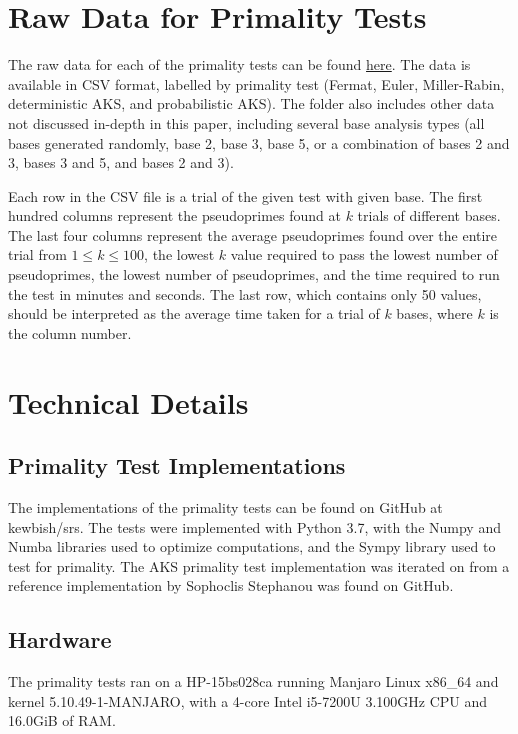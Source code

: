 \documentclass{article}
\begin{document}
\appendix
\begin{appendices}
\section{Raw Data for Primality Tests} \label{appendix:data}

The raw data for each of the primality tests can be found \href{https://github.com/kewbish/srs/tree/master/scripts/dataset}{here}. %
The data is available in CSV format, labelled by primality test (Fermat, Euler, Miller-Rabin, deterministic AKS, and probabilistic AKS). The folder also includes other data not discussed in-depth in this paper, including several base analysis types (all bases generated randomly, base 2, base 3, base 5, or a combination of bases 2 and 3, bases 3 and 5, and bases 2 and 3).

Each row in the CSV file is a trial of the given test with given base. The first hundred columns represent the pseudoprimes found at $k$ trials of different bases. The last four columns represent the average pseudoprimes found over the entire trial from $1 \leq k \leq 100$, the lowest $k$ value required to pass the lowest number of pseudoprimes, the lowest number of pseudoprimes, and the time required to run the test in minutes and seconds. 
The last row, which contains only 50 values, should be interpreted as the average time taken for a trial of $k$ bases, where $k$ is the column number.

\section{Technical Details} \label{appendix:tech}

\subsection{Primality Test Implementations}
The implementations of the primality tests can be found on GitHub at kewbish/srs. %
The tests were implemented with Python 3.7, with the Numpy and Numba libraries used to optimize computations, and the Sympy library used to test for primality.
The AKS primality test implementation was iterated on from a reference implementation by Sophoclis Stephanou was found on GitHub. %

\subsection{Hardware}
The primality tests ran on a HP-15bs028ca running Manjaro Linux x86\_64 and kernel 5.10.49-1-MANJARO, with a 4-core Intel i5-7200U 3.100GHz CPU and 16.0GiB of RAM.

\end{appendices}
\end{document}
